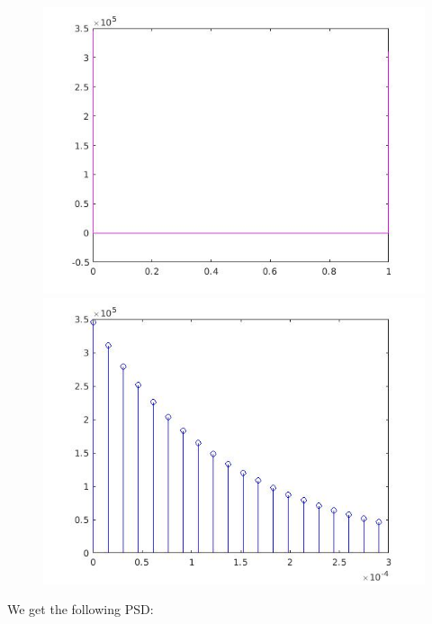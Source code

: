 \documentclass[a4paper,11pt]{article}
\begin{document}
\begin{figure}[!hp]
\centering
\begin{minipage}{.5\textwidth}
  \centering
  \includegraphics[width=1\linewidth]{images/lab1_29.jpg}
\end{minipage}%
\begin{minipage}{.5\textwidth}
  \centering
  \includegraphics[width=1\linewidth]{images/lab1_30.jpg}
\end{minipage}
\end{figure}

We get the following PSD:
\end{document}
